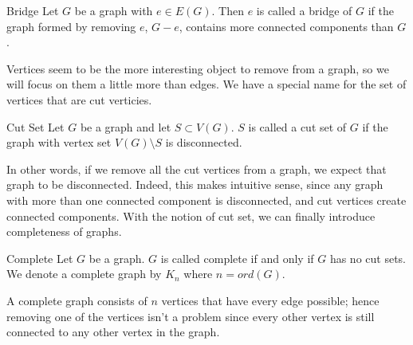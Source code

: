 \begin{definition}{Bridge}
	Let $G$ be a graph with $e\in E(G)$. Then $e$ is called a bridge of $G$ if the graph formed by removing $e$, $G-e$, contains more connected components than $G$.
\end{definition}

Vertices seem to be the more interesting object to remove from a graph, so we will focus on them a little more than edges.
We have a special name for the set of vertices that are cut verticies.

\begin{definition}{Cut Set}
	Let $G$ be a graph and let $S\subset V(G)$. $S$ is called a cut set of $G$ if the graph with vertex set $V(G)\setminus S$ is disconnected.
\end{definition}

In other words, if we remove all the cut vertices from a graph, we expect that graph to be disconnected.
Indeed, this makes intuitive sense, since any graph with more than one connected component is disconnected, and cut vertices create connected components.
With the notion of cut set, we can finally introduce completeness of graphs.

\begin{definition}{Complete}
	Let $G$ be a graph. $G$ is called complete if and only if $G$ has no cut sets.
	We denote a complete graph by $K_{n}$ where $n=ord(G)$.
\end{definition}

A complete graph consists of $n$ vertices that have every edge possible; hence removing one of the vertices isn't a problem since every other vertex is still connected to any other vertex in the graph.

